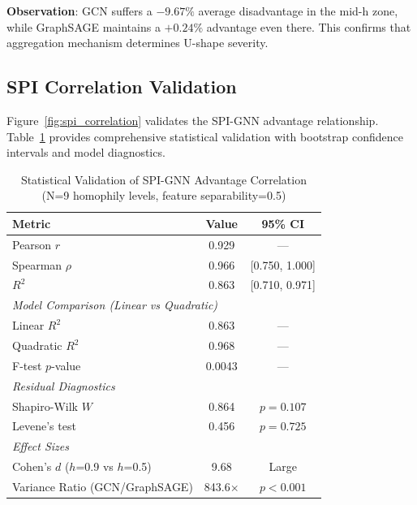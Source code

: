 \textbf{Observation}: GCN suffers a $-9.67\%$ average disadvantage in the mid-h zone, while GraphSAGE maintains a $+0.24\%$ advantage even there. This confirms that aggregation mechanism determines U-shape severity.

\subsection{SPI Correlation Validation}

Figure~\ref{fig:spi_correlation} validates the SPI-GNN advantage relationship. Table~\ref{tab:statistical_validation} provides comprehensive statistical validation with bootstrap confidence intervals and model diagnostics.

\begin{table}[t]
\centering
\caption{Statistical Validation of SPI-GNN Advantage Correlation (N=9 homophily levels, feature separability=0.5)}
\label{tab:statistical_validation}
\begin{tabular}{lcc}
\toprule
\textbf{Metric} & \textbf{Value} & \textbf{95\% CI} \\
\midrule
Pearson $r$ & 0.929 & --- \\
Spearman $\rho$ & 0.966 & [0.750, 1.000] \\
$R^2$ & 0.863 & [0.710, 0.971] \\
\midrule
\multicolumn{3}{l}{\textit{Model Comparison (Linear vs Quadratic)}} \\
Linear $R^2$ & 0.863 & --- \\
Quadratic $R^2$ & 0.968 & --- \\
F-test $p$-value & 0.0043 & --- \\
\midrule
\multicolumn{3}{l}{\textit{Residual Diagnostics}} \\
Shapiro-Wilk $W$ & 0.864 & $p = 0.107$ \\
Levene's test & 0.456 & $p = 0.725$ \\
\midrule
\multicolumn{3}{l}{\textit{Effect Sizes}} \\
Cohen's $d$ ($h$=0.9 vs $h$=0.5) & 9.68 & Large \\
Variance Ratio (GCN/GraphSAGE) & 843.6$\times$ & $p < 0.001$ \\
\bottomrule
\end{tabular}
\end{table}

